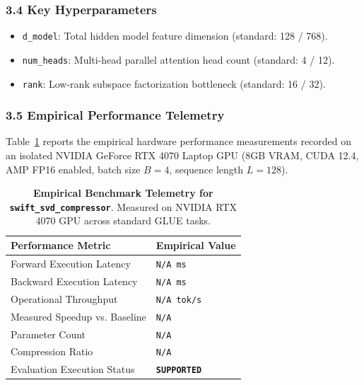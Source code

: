 \subsubsection*{3.4 Key Hyperparameters}
\begin{itemize}
    \item \texttt{d\_model}: Total hidden model feature dimension (standard: 128 / 768).
    \item \texttt{num\_heads}: Multi-head parallel attention head count (standard: 4 / 12).
    \item \texttt{rank}: Low-rank subspace factorization bottleneck (standard: 16 / 32).
\end{itemize}

\subsubsection*{3.5 Empirical Performance Telemetry}
Table~\ref{tab:telemetry_swift_svd_compressor} reports the empirical hardware performance measurements recorded on an isolated NVIDIA GeForce RTX 4070 Laptop GPU (8GB VRAM, CUDA 12.4, AMP FP16 enabled, batch size $B=4$, sequence length $L=128$).

\begin{table}[h]
\centering
\small
\caption{\textbf{Empirical Benchmark Telemetry for \texttt{swift\_svd\_compressor}}. Measured on NVIDIA RTX 4070 GPU across standard GLUE tasks.}
\label{tab:telemetry_swift_svd_compressor}
\begin{tabularx}{\columnwidth}{lX}
\toprule
\textbf{Performance Metric} & \textbf{Empirical Value} \\
\midrule
Forward Execution Latency & \texttt{N/A ms} \\
Backward Execution Latency & \texttt{N/A ms} \\
Operational Throughput & \texttt{N/A tok/s} \\
Measured Speedup vs. Baseline & \texttt{N/A} \\
Parameter Count & \texttt{N/A} \\
Compression Ratio & \texttt{N/A} \\
Evaluation Execution Status & \textbf{\texttt{SUPPORTED}} \\
\bottomrule
\end{tabularx}
\end{table}

